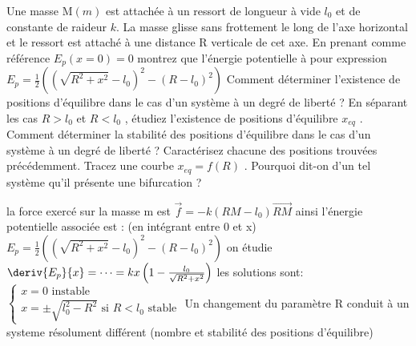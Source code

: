 \begin{Exercise}[title=Brisure de symétrie]
  Une masse M$(m)$ est attachée à un ressort de longueur à vide $l_0$ et de
  constante de raideur $k$.
  La masse glisse sans frottement le long de l'axe horizontal et le ressort est
  attaché à une distance R verticale de cet axe.
  \Question En prenant comme référence $E_p(x=0)=0$ montrez que l'énergie
  potentielle à pour expression
  $E_p=\frac{1}{2}\left(\left(\sqrt{R^2+x^2}-l_0\right)^2-(R-l_0)^2\right)$
  \Question Comment déterminer l'existence de positions d'équilibre dans le cas
  d'un système à un degré de liberté ? En séparant les cas $R > l_0$ et $R<l_0$ ,
  étudiez l'existence de positions d'équilibre $x_{eq}$ .
  \Question Comment déterminer la stabilité des positions d'équilibre dans le
  cas d'un système à un degré de liberté ?
  Caractérisez chacune des positions trouvées précédemment.
  \Question Tracez une courbe $x_{eq} = f(R)$ . Pourquoi dit-on d'un tel système
  qu'il présente une bifurcation ?

\end{Exercise}
\begin{Answer}
  \Question la force exercé sur la masse m est $\vec{f}=-k(RM-l_0)\vec{RM}$
  ainsi l'énergie potentielle associée est : (en intégrant entre 0 et x)
  $E_p=\frac{1}{2}\left(\left(\sqrt{R^2+x^2}-l_0\right)^2-(R-l_0)^2\right)$
  \Question on étudie $\deriv{E_p}{x}=\dots=kx \left( 1-\frac{l_0}{\sqrt{R^2+x^2}} \right)$
  les solutions sont:
  $
  \begin{cases}
    x=0 \text{ instable } \\
    x=\pm\sqrt{l_0^2-R^2} \text{ si } R<l_0 \text{ stable}
  \end{cases}
  $
  \Question Un changement du paramètre R conduit à un systeme résolument
  différent (nombre et stabilité des positions d'équilibre)
\end{Answer}

